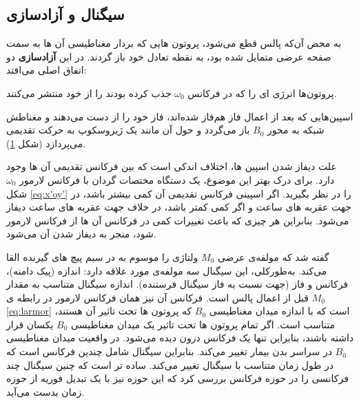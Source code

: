 \subsection{سیگنال  و آزادسازی}

به محض آن‌که پالس  قطع می‌شود، پروتون هایی که بردار مغناطیسی آن ها به سمت صفحه عرضی متمایل شده بود، به نقطه تعادل خود باز گردند. در این \textbf{آزاد‌سازی} 
دو اتفاق اصلی می‌افتد:
\begin{enuminline}
	\item پروتون‌ها انرژی ای را که در فرکانس $\omega_0$ جذب کرده بودند را از خود منتشر می‌کنند.
	\item اسپین‌هایی که بعد از اعمال فاز هم‌فاز شده‌اند، فاز خود را از دست می‌دهند و مغناطش شبکه به محور $B_0$ باز می‌گردد و حول آن مانند یک ژیروسکوپ به حرکت تقدیمی می‌پردازد (شکل \ref{fig:rotating-axis-coil}).
\end{enuminline}




\begin{figure}
	\centering
	\caption{}
	\label{fig:rotating-axis-coil}
\end{figure}

علت دیفاز شدن اسپین ها، اختلاف اندکی است که بین فرکانس تقدیمی آن ها وجود دارد. برای درک بهتر این موضوع، یک دستگاه مختصات گردان با فرکانس لارمور $\omega_0$ شکل \ref{eq:x'oy'} را در نظر بگیرید. اگر اسپینی فرکانس تقدیمی آن کمی بیشتر باشد، در جهت عقربه های ساعت و اگر کمی کمتر باشد، در خلاف جهت عقربه های ساعت دیفاز می‌شود. بنابراین هر چیزی که باعث تغییرات کمی در فرکانس  آن ها از فرکانس لارمور شود، منجر به دیفاز شدن آن می‌شود. \cite{McRobbie}

گفته شد که مولفه‌ی عرضی $M_0$ ولتاژی را موسوم به  در سیم پیچ های گیرنده القا می‌کند. به‌طور‌کلی، 
این سیگنال  سه مولفه‌ی مورد علاقه دارد: اندازه 
(پیک دامنه‌)، فرکانس و فاز (جهت نسبت به فاز سیگنال  فرستنده).
اندازه سیگنال متناسب به مقدار $M_0$ قبل از اعمال پالس  است. فرکانس آن نیز همان فرکانس لارمور در رابطه ی \ref{eq:larmor} است که با اندازه میدان مغناطیسی $B_0$ که پروتون ها تحت تاثیر آن هستند، متناسب است.
اگر تمام پروتون ها تحت تاثیر یک میدان مغناطیسی $B_0$ یکسان قرار داشته باشند،  بنابراین تنها یک فرکانس درون  دیده می‌شود. در واقعیت میدان مغناطیسی $B_0$ در سراسر بدن بیمار تغییر می‌کند. بنابراین سیگنال 
شامل چندین فرکانس  است که در طول زمان متناسب با سیگنال  تغییر می‌کند. ساده تر است که چنین سیگنال چند فرکانسی را در حوزه فرکانس بررسی کرد که این حوزه نیز با یک تبدیل فوریه 
از حوزه زمان بدست می‌آید.\cite{book:basic-principles-and-applications}




